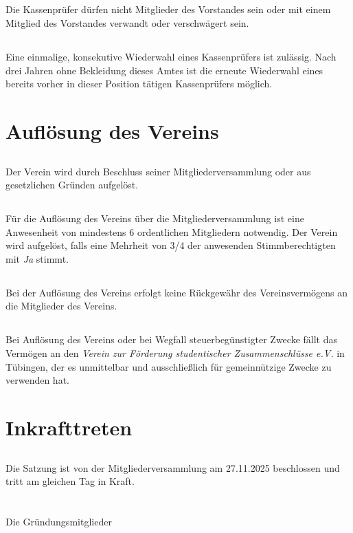 \documentclass[12pt]{article}
\begin{document}
\subsection{}
Die Kassenprüfer dürfen nicht Mitglieder des Vorstandes sein oder mit einem Mitglied des Vorstandes verwandt oder verschwägert sein. 
\subsection{}
Eine einmalige, konsekutive Wiederwahl eines Kassenprüfers ist zulässig. Nach drei Jahren ohne Bekleidung dieses Amtes ist die erneute Wiederwahl eines bereits vorher in dieser Position tätigen Kassenprüfers möglich.

\section{Auflösung des Vereins}
\subsection{}
Der Verein wird durch Beschluss seiner Mitgliederversammlung oder aus gesetzlichen Gründen aufgelöst.
\subsection{}
Für die Auflösung des Vereins über die Mitgliederversammlung ist eine Anwesenheit von mindestens 6 ordentlichen Mitgliedern notwendig. Der Verein wird aufgelöst, falls eine Mehrheit von 3/4 der anwesenden Stimmberechtigten mit \textit{Ja} stimmt.
\subsection{}
Bei der Auflösung des Vereins erfolgt keine Rückgewähr des Vereinsvermögens an die Mitglieder des Vereins.
\subsection{}
Bei Auflösung des Vereins oder bei Wegfall steuerbegünstigter Zwecke fällt das Vermögen an den \textit{\glqq{}Verein zur Förderung studentischer Zusammenschlüsse e.V.\grqq{}} in Tübingen, der es unmittelbar und ausschließlich für gemeinnützige Zwecke zu verwenden hat.

\section{Inkrafttreten}
\subsection{}
Die Satzung ist von der Mitgliederversammlung am 27.11.2025 beschlossen und tritt am gleichen Tag in Kraft.

\vspace{5cm}
\section*{}
Die Gründungsmitglieder
\end{document}
